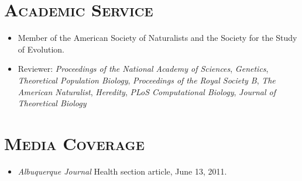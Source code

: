 \documentclass[centered,overlapped,line]{res}
\begin{document}
\begin{resume}

  \section{\bf \large \scshape  Academic Service}
  \begin{itemize}[]
  \item Member of the American Society of Naturalists and the Society for the Study of Evolution.
  \item Reviewer: \textit{Proceedings of the National Academy of Sciences}, \textit{Genetics}, \textit{Theoretical Population Biology}, \textit{Proceedings of the Royal Society B}, \textit{The American Naturalist}, \textit{Heredity}, \textit{PLoS Computational Biology}, \textit{Journal of Theoretical Biology}
  \end{itemize}


  \section{\bf \large \scshape  Media Coverage}
  \begin{itemize}[]
  \item \textit{Albuquerque Journal} Health section article, June 13, 2011.
  \end{itemize}


  \pagestyle{fancy}

\end{resume}
\end{document}
